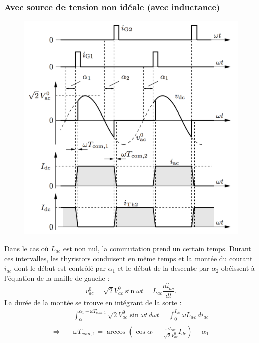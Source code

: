 			\subsubsection{Avec source de tension non idéale (avec inductance)}
				\begin{figure}
				\vspace{-5mm}
				\includegraphics[scale=0.3]{ch3/4}
				\end{figure}
				Dans le cas où $L_{ac}$ est non nul, la commutation prend un certain temps. Durant ces intervalles, les thyristors conduisent en même temps et la montée du courant $i_{ac}$ dont le début est contrôlé par $\alpha _1$ et le début de la descente par $\alpha _2$ obéissent à l'équation de la maille de gauche :
				\begin{equation}
					v_{ac}^0 = \sqrt{2} V_{ac}^0 \sin \omega t = L_{ac} \frac{di_{ac}}{dt}. 
				\end{equation}
				La durée de la montée se trouve en intégrant de la sorte :				
				\begin{equation}
				\begin{aligned}
					&\int _{\alpha _1} ^{\alpha _1 + \omega T_{com,1}} \sqrt{2} V_{ac}^0 \sin \omega t \, d\omega t = \int _0^{I_{dc}} \omega L_{ac} \, di_{ac}\\ \Rightarrow\quad &\omega T_{com,1} = \arccos \left( \cos \alpha _1 - \frac{\omega L_{ac}}{\sqrt{2}V_{ac}^0}I_{dc} \right) - \alpha _1
					\end{aligned}
				\end{equation}
				
